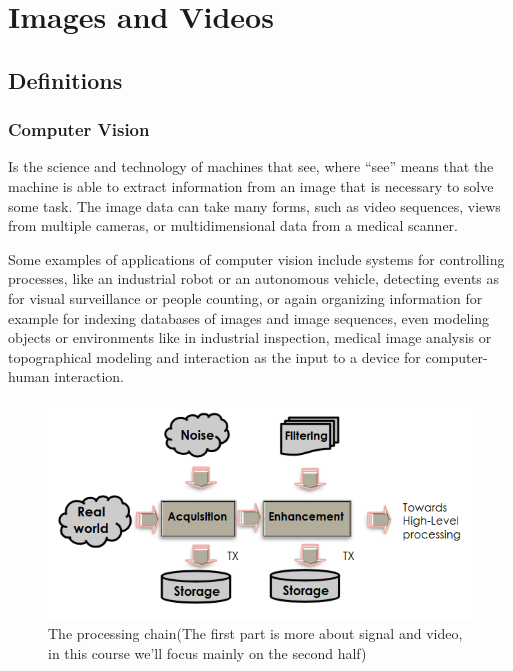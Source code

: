 
\chapter{Images and Videos}

\section{Definitions}
\subsection{Computer Vision}
Is the science and technology of machines that see, where “see” means that the machine is able to extract information from an image that is necessary to solve some task. The image data can take many forms, such as video sequences, views from multiple cameras, or multidimensional data from a medical scanner.

Some examples of applications of computer vision include systems for controlling processes, like an industrial robot or an autonomous vehicle, detecting events as for visual surveillance or people counting, or again organizing information for example for indexing databases of images and image sequences, even modeling objects or environments like in industrial inspection, medical image analysis or topographical modeling and interaction as the input to a device for computer-human interaction.

\begin{figure}[h]
    \centering
    \includegraphics[scale=0.5]{Figures/ProcessingChain.png}
    \caption{The processing chain(The first part is more about signal and video, in this course we'll focus mainly on the second half)}
    \label{fig:enter-label}
\end{figure}


